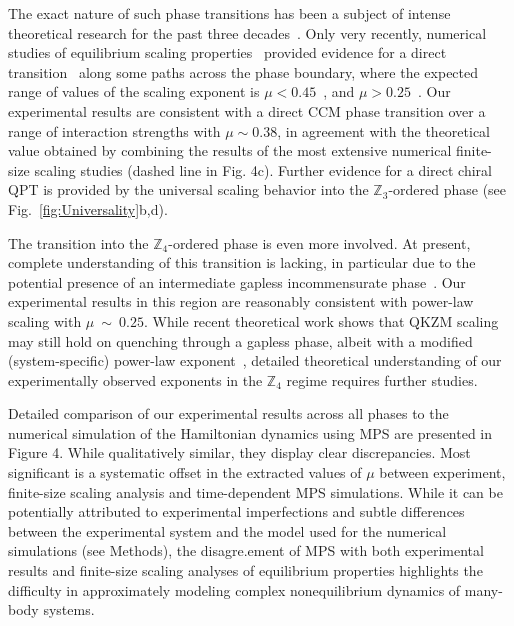 \documentclass[prl,nobalancelastpage,superscriptaddress,twocolumn,nofootinbib]{revtex4}
\begin{document}
The exact nature of such phase transitions has been a subject of intense theoretical research for the past three decades~\cite{Huse1982,Ostlund1981,haldane1983phase,Samajdar2018,Whitsitt2018,Chepiga2018}. Only very recently, numerical studies of equilibrium scaling properties~\cite{Samajdar2018,Whitsitt2018,Chepiga2018} 
provided evidence for 
a direct transition~\cite{Chepiga2018} along some paths across the phase boundary, where  
the expected range of values of the scaling exponent is $\mu<0.45$~\cite{Samajdar2018}, and $\mu>0.25$~\cite{Whitsitt2018}.
Our experimental results are 
consistent with a direct CCM phase transition over a range of interaction strengths
with $\mu\sim0.38$,  in agreement with the theoretical value obtained by combining the results of the most extensive numerical finite-size scaling studies \cite{Samajdar2018,Chepiga2018} (dashed line in Fig. 4c). Further evidence for a direct chiral QPT is provided by 
the universal scaling behavior  into the $\mathbb{Z}_3$-ordered phase (see Fig.~\ref{fig:Universality}b,d). 

The transition into the $\mathbb{Z}_4$-ordered phase is even more involved. At present, complete understanding of this transition is lacking, in particular  
due to the potential presence of an
intermediate gapless incommensurate phase~\cite{Ostlund1981,haldane1983phase}.  Our experimental results in this region are reasonably consistent with power-law scaling with $\mu~\sim~0.25$.  While recent theoretical work shows that QKZM scaling may still hold on quenching through a gapless phase, albeit with a modified (system-specific) power-law  exponent~\cite{Dutta2015}, 
detailed theoretical understanding of our experimentally observed exponents in the $\mathbb{Z}_4$ regime requires further studies.

Detailed comparison of  our experimental results across all phases to the numerical simulation of the Hamiltonian dynamics using MPS are presented in Figure 4. While 
 qualitatively similar, they display clear discrepancies. 
 Most significant is  
 a systematic offset in the extracted values of $\mu$
 between experiment,  finite-size scaling analysis and time-dependent MPS simulations. 
 While it  can be potentially attributed to experimental imperfections and 
 subtle differences between the experimental system and the model used for the numerical simulations (see Methods), the disagre.ement of MPS with both experimental results and finite-size scaling analyses of equilibrium properties
highlights the difficulty in approximately modeling complex nonequilibrium dynamics of many-body systems. 
\end{document}
